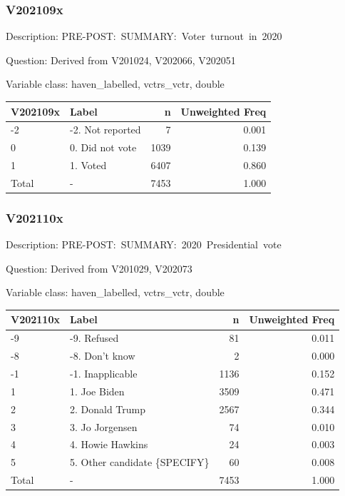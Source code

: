 \documentclass[
]{krantz}
\begin{document}
\hypertarget{v202109x}{%
\subsubsection*{V202109x}\label{v202109x}}


Description: PRE-POST:~SUMMARY:~Voter~turnout~in~2020

Question: Derived from V201024, V202066, V202051

Variable class: haven\_labelled, vctrs\_vctr, double

\begin{tabular}[t]{l|l|r|r}
\hline
V202109x & Label & n & Unweighted Freq\\
\hline
-2 & -2. Not reported & 7 & 0.001\\
\hline
0 & 0. Did not vote & 1039 & 0.139\\
\hline
1 & 1. Voted & 6407 & 0.860\\
\hline
Total & - & 7453 & 1.000\\
\hline
\end{tabular}

\hypertarget{v202110x}{%
\subsubsection*{V202110x}\label{v202110x}}


Description: PRE-POST:~SUMMARY:~2020~Presidential~vote

Question: Derived from V201029, V202073

Variable class: haven\_labelled, vctrs\_vctr, double

\begin{tabular}[t]{l|l|r|r}
\hline
V202110x & Label & n & Unweighted Freq\\
\hline
-9 & -9. Refused & 81 & 0.011\\
\hline
-8 & -8. Don't know & 2 & 0.000\\
\hline
-1 & -1. Inapplicable & 1136 & 0.152\\
\hline
1 & 1. Joe Biden & 3509 & 0.471\\
\hline
2 & 2. Donald Trump & 2567 & 0.344\\
\hline
3 & 3. Jo Jorgensen & 74 & 0.010\\
\hline
4 & 4. Howie Hawkins & 24 & 0.003\\
\hline
5 & 5. Other candidate \{SPECIFY\} & 60 & 0.008\\
\hline
Total & - & 7453 & 1.000\\
\hline
\end{tabular}
\end{document}
